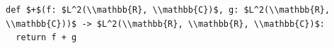 \documentclass[border=10pt]{standalone}
\begin{document}
\begin{lstlisting}
def $+$(f: $L^2(\\mathbb{R}, \\mathbb{C})$, g: $L^2(\\mathbb{R}, \\mathbb{C}))$ -> $L^2(\\mathbb{R}, \\mathbb{R}, \\mathbb{C})$:
  return f + g
\end{lstlisting}
\end{document}
